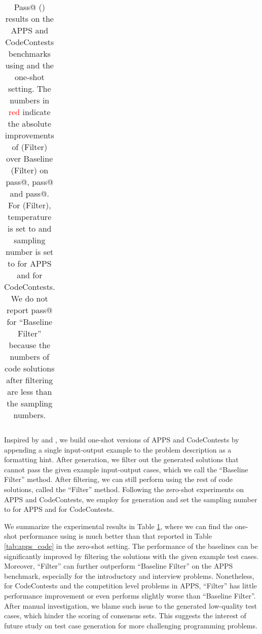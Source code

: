 \begin{table}[t]
{\begin{tabular}{lllllllllll}
        \bottomrule
        \end{tabular}
    }
    \caption{Pass@ () results on the APPS and CodeContests benchmarks using \davincitwo and the one-shot setting. The numbers in {\textcolor{red}{red}} indicate the absolute improvements of \ours (Filter) over Baseline (Filter) on pass@, pass@ and pass@.
    For \ours (Filter), temperature is set to  and sampling number is set to  for APPS and  for CodeContests. We do not report pass@ for ``Baseline Filter'' because the numbers of code solutions after filtering are less than the sampling numbers.
    }
    \label{tab:apps_code_oneshot}
\end{table}
Inspired by \cite{chen2021evaluating} and \cite{li2022competition}, we build one-shot versions of APPS and CodeContests by appending a single input-output example to the problem description as a formatting hint. After generation, we filter out the generated solutions that cannot pass the given example input-output cases, which we call the ``Baseline Filter'' method. After filtering, we can still perform \ours using the rest of code solutions, called the ``\ours Filter'' method.
Following the zero-shot experiments on APPS and CodeContests, we employ \davincitwo for generation and set the sampling number to  for APPS and  for CodeContests.

We summarize the experimental results in Table \ref{tab:apps_code_oneshot}, where we can find the one-shot performance using \ours is much better than that reported in Table \ref{tab:apps_code} in the zero-shot setting. The performance of the baselines can be significantly improved by filtering the solutions with the given example test cases. Moreover, ``\ours Filter'' can further outperform ``Baseline Filter'' on the APPS benchmark, especially for the introductory and interview problems. Nonetheless, for CodeContests and the competition level problems in APPS, ``\ours Filter'' has little performance improvement or even performs slightly worse than ``Baseline Filter''. After manual investigation, we blame such issue to the generated low-quality test cases, which hinder the scoring of consensus sets. This suggests the interest of future study on test case generation for more challenging programming problems.


